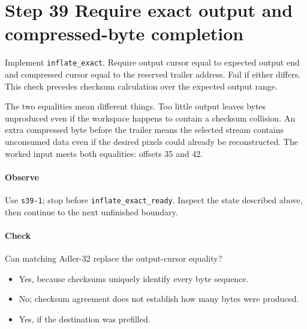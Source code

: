 \section{Step 39 Require exact output and compressed-byte completion}\label{png-inflate-s39}
Implement \texttt{inflate\_exact}. Require output cursor equal to expected output end and compressed cursor equal to the reserved trailer address. Fail if either differs. This check precedes checksum calculation over the expected output range.

The two equalities mean different things. Too little output leaves bytes unproduced even if the workspace happens to contain a checksum collision. An extra compressed byte before the trailer means the selected stream contains unconsumed data even if the desired pixels could already be reconstructed. The worked input meets both equalities: offsets 35 and 42.

\paragraph{Observe} Use \texttt{s39-1}; stop before \texttt{inflate\_exact\_ready}. Inspect the state described above, then continue to the next unfinished boundary.

\paragraph{Check} Can matching Adler-32 replace the output-cursor equality?
\begin{itemize}
  \item[A.] Yes, because checksums uniquely identify every byte sequence.
  \item[B.] No; checksum agreement does not establish how many bytes were produced.
  \item[C.] Yes, if the destination was prefilled.
\end{itemize}
